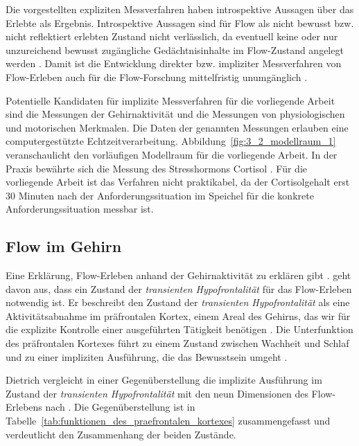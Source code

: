 Die vorgestellten expliziten Messverfahren haben introspektive Aussagen über das Erlebte als Ergebnis. Introspektive Aussagen sind für Flow als nicht bewusst bzw. nicht reflektiert erlebten Zustand nicht verlässlich, da eventuell keine oder nur unzureichend bewusst zugängliche Gedächtnisinhalte im Flow-Zustand angelegt werden \citep[vgl.][S.~82]{Henk2014}. Damit ist die Entwicklung direkter bzw. impliziter Messverfahren von Flow-Erleben auch für die Flow-Forschung mittelfristig unumgänglich \citep[vgl.][S.~86]{Henk2014}.

Potentielle Kandidaten für implizite Messverfahren für die vorliegende Arbeit sind die Messungen der Gehirnaktivität und die Messungen von physiologischen und motorischen Merkmalen. Die Daten der genannten Messungen erlauben eine computergestützte Echtzeitverarbeitung. Abbildung~\ref{fig:3_2_modellraum_1} veranschaulicht den vorläufigen Modellraum für die vorliegende Arbeit. In der Praxis bewährte sich die Messung des Stresshormons Cortisol \citep{Keller2011, Peifer2014, Peifer2015}. Für die vorliegende Arbeit ist das Verfahren nicht praktikabel, da der Cortisolgehalt erst 30 Minuten nach der Anforderungssituation im Speichel für die konkrete Anforderungssituation messbar ist.

\subsection{Flow im Gehirn}

Eine Erklärung, Flow-Erleben anhand der Gehirnaktivität zu erklären gibt \citet{Dietrich2004}. \citet[S.~758f.]{Dietrich2004} geht davon aus, dass ein Zustand der \emph{transienten Hypofrontalität} für das Flow-Erleben notwendig ist. Er beschreibt den Zustand der \emph{transienten Hypofrontalität} als eine Aktivitätsabnahme im präfrontalen Kortex, einem Areal des Gehirns, das wir für die explizite Kontrolle einer ausgeführten Tätigkeit benötigen \citep[vgl.][]{Dietrich2003, Dietrich2004}. Die Unterfunktion des präfrontalen Kortexes führt zu einem Zustand zwischen Wachheit und Schlaf \citep[vgl.][S.~241]{Dietrich2003} und zu einer impliziten Ausführung, die das Bewusstsein umgeht \citep[vgl.][S.~753]{Dietrich2004}.

Dietrich \citep[][S.~757]{Dietrich2004} vergleicht in einer Gegenüberstellung die implizite Ausführung im Zustand der \emph{transienten Hypofrontalität} mit den neun Dimensionen des Flow-Erlebens nach \citet{Csikszentmihalyi1992}. Die Gegenüberstellung ist in Tabelle~\ref{tab:funktionen_des_praefrontalen_kortexes} zusammengefasst und verdeutlicht den Zusammenhang der beiden Zustände.

